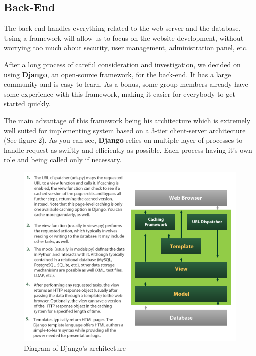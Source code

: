 \subsection{Back-End}

The back-end handles everything related to the web server and the database. Using a framework will allow us to focus on the website development, without worrying too much about security, user management, administration panel, etc.\newline

After a long process of careful consideration and investigation, we decided on using \textbf{Django}, an open-source framework, for the back-end. It has a large community and is easy to learn. As a bonus, some group members already have some experience with this framework, making it easier for everybody to get started quickly.\newline

The main advantage of this framework being his architecture which is extremely well suited for implementing system based on a 3-tier client-server architecture (See figure 2). As you can see, \textbf{Django} relies on multiple layer of processes to handle request as swiftly and efficiently as possible. Each process having it's own role and being called only if necessary.  \newline

\begin{figure}
	\centering
	\includegraphics[width=0.85\linewidth]{DjangoArchitecture.png}
	\caption{Diagram of Django's architecture}
	\label{fig:length_eight_mouse}
\end{figure}

